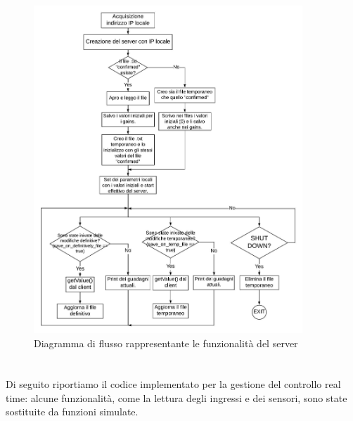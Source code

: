\chapter{}
\label{cod:Appendice_opcua}
\begin{figure}[h]
	\centering   	
	\includegraphics[width=0.9\textwidth]{Immagini/OPCUA_diagram.jpeg}
	\caption{Diagramma di flusso rappresentante le funzionalità del server}
	\label{fig:OPCUA_diagram}
\end{figure}

\newpage


\chapter{}
Di seguito riportiamo il codice implementato per la gestione del controllo real time: alcune funzionalità, come la lettura degli ingressi e dei sensori, sono state sostituite da funzioni simulate.
